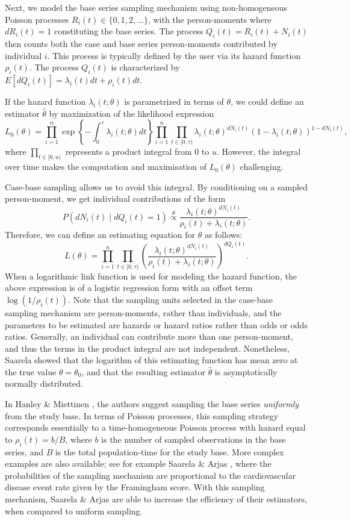 \documentclass[
]{jss}
\begin{document}
Next, we model the base series sampling mechanism using non-homogeneous
Poisson processes \(R_i(t) \in \{0, 1, 2, \ldots\}\), with the
person-moments where \(dR_i(t) = 1\) constituting the base series. The
process \(Q_{i}(t) = R_i(t) + N_{i}(t)\) then counts both the case and
base series person-moments contributed by individual \(i\). This process
is typically defined by the user via its hazard function \(\rho_i(t)\).
The process \(Q_{i}(t)\) is characterized by
\(E[dQ_{i}(t)] = \lambda_{i}(t)dt + \rho_i(t)dt\).

If the hazard function \(\lambda_{i}(t; \theta)\) is parametrized in
terms of \(\theta\), we could define an estimator \(\hat{\theta}\) by
maximization of the likelihood expression
\[L_0(\theta) = \prod_{i=1}^n \exp\left\{ -\int_0^\tau \lambda_i(t; \theta) dt \right\} \prod_{i=1}^{n} \prod_{t\in[0,\tau)} \lambda_{i}(t;\theta)^{dN_{i}(t)}\left(1 - \lambda_{i}(t;\theta)\right)^{1 - dN_{i}(t)},\]
where \(\prod_{t\in[0,u)}\) represents a product integral from \(0\) to
\(u\). However, the integral over time makes the computation and
maximisation of \(L_0(\theta)\) challenging.

Case-base sampling allows us to avoid this integral. By conditioning on
a sampled person-moment, we get individual contributions of the form
\[P(dN_{i}(t) \mid dQ_{i}(t) = 1) \stackrel{\theta}{\propto} \frac{\lambda_{i}(t; \theta)^{dN_{i}(t)}}{\rho_i(t) + \lambda_{i}(t;\theta)}.\]
Therefore, we can define an estimating equation for \(\theta\) as
follows:
\[L(\theta) = \prod_{i=1}^{n} \prod_{t\in[0,\tau)} \left(\frac{\lambda_{i}(t; \theta)^{dN_{i}(t)}}{\rho_i(t) + \lambda_{i}(t;\theta)}\right)^{dQ_i(t)}.\]
When a logarithmic link function is used for modeling the hazard
function, the above expression is of a logistic regression form with an
offset term \(\log(1/\rho_i(t))\). Note that the sampling units selected
in the case-base sampling mechanism are person-moments, rather than
individuals, and the parameters to be estimated are hazards or hazard
ratios rather than odds or odds ratios. Generally, an individual can
contribute more than one person-moment, and thus the terms in the
product integral are not independent. Nonetheless, Saarela
\citeyearpar{saarela2016case} showed that the logarithm of this
estimating function has mean zero at the true value \(\theta=\theta_0\),
and that the resulting estimator \(\hat{\theta}\) is asymptotically
normally distributed.

In Hanley \& Miettinen \citeyearpar{hanley2009fitting}, the authors
suggest sampling the base series \emph{uniformly} from the study base.
In terms of Poisson processes, this sampling strategy corresponds
essentially to a time-homogeneous Poisson process with hazard equal to
\(\rho_i(t) = b/B\), where \(b\) is the number of sampled observations
in the base series, and \(B\) is the total population-time for the study
base. More complex examples are also available; see for example Saarela
\& Arjas \citeyearpar{saarela2015non}, where the probabilities of the
sampling mechanism are proportional to the cardiovascular disease event
rate given by the Framingham score. With this sampling mechanism,
Saarela \& Arjas are able to increase the efficiency of their
estimators, when compared to uniform sampling.
\end{document}
